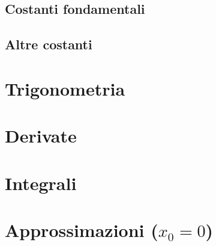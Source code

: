 \documentclass[70pt]{article}
\begin{document}
\begin{small}
\begin{multicols}{3}
	\subsection{Costanti fondamentali}
	\subsection{Altre costanti}
\section{Trigonometria}
\section{Derivate}
\section{Integrali}
\section{Approssimazioni ($x_0 = 0$)}

	\end{multicols}
	\end{small}
\end{document}
